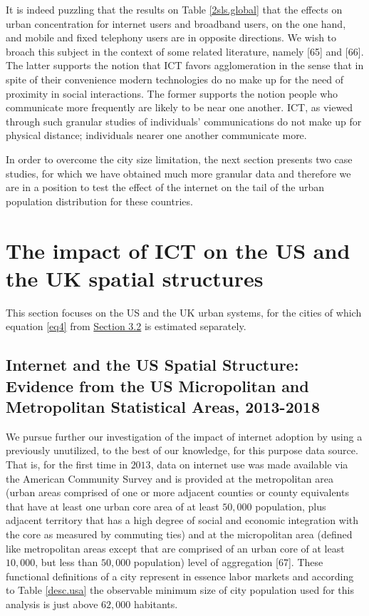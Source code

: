 \documentclass[10pt,letterpaper]{article}
\begin{document}
It is indeed puzzling that the results on Table \ref{2sls.global} that
the effects on urban concentration for internet users and broadband
users, on the one hand, and mobile and fixed telephony users are in
opposite directions. We wish to broach this subject in the context of
some related literature, namely {[}65{]} and {[}66{]}. The latter
supports the notion that ICT favors agglomeration in the sense that in
spite of their convenience modern technologies do no make up for the
need of proximity in social interactions. The former supports the notion
people who communicate more frequently are likely to be near one
another. ICT, as viewed through such granular studies of individuals'
communications do not make up for physical distance; individuals nearer
one another communicate more.

In order to overcome the city size limitation, the next section presents
two case studies, for which we have obtained much more granular data and
therefore we are in a position to test the effect of the internet on the
tail of the urban population distribution for these countries.

\hypertarget{sec5}{%
\section{The impact of ICT on the US and the UK spatial
structures}\label{sec5}}

This section focuses on the US and the UK urban systems, for the cities
of which equation \ref{eq4} from \protect\hyperlink{sec3.2}{Section 3.2}
is estimated separately.

\hypertarget{sec5.1}{%
\subsection{Internet and the US Spatial Structure: Evidence from the US
Micropolitan and Metropolitan Statistical Areas,
2013-2018}\label{sec5.1}}

We pursue further our investigation of the impact of internet adoption
by using a previously unutilized, to the best of our knowledge, for this
purpose data source. That is, for the first time in \(2013\), data on
internet use was made available via the American Community Survey and is
provided at the metropolitan area (urban areas comprised of one or more
adjacent counties or county equivalents that have at least one urban
core area of at least \(50,000\) population, plus adjacent territory
that has a high degree of social and economic integration with the core
as measured by commuting ties) and at the micropolitan area (defined
like metropolitan areas except that are comprised of an urban core of at
least \(10,000\), but less than \(50,000\) population) level of
aggregation {[}67{]}. These functional definitions of a city represent
in essence labor markets and according to Table \ref{desc.usa} the
observable minimum size of city population used for this analysis is
just above \(62,000\) habitants.
\end{document}
